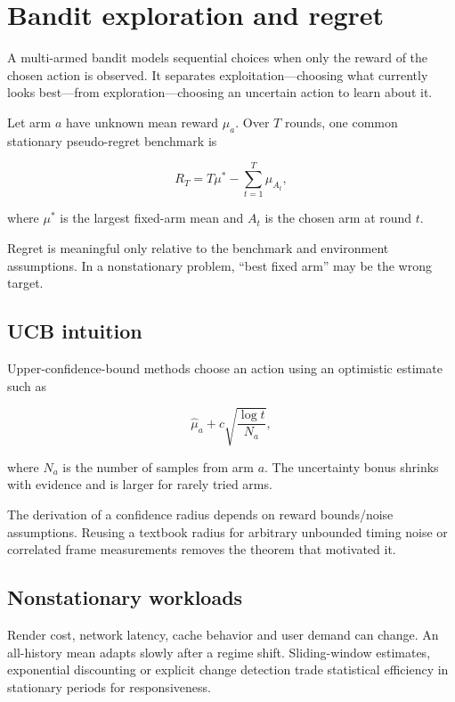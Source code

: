 \hypertarget{appendix-3dc863dbddf3}{}\label{referencestart:appendix-3dc863dbddf3}
\section{Bandit exploration and regret}\label{appendix-3dc863dbddf3-bandit-exploration-and-regret}

A multi-armed bandit models sequential choices when only the reward of the chosen action is observed. It separates exploitation---choosing what currently looks best---from exploration---choosing an uncertain action to learn about it.

Let arm \(a\) have unknown mean reward \(\mu_a\). Over \(T\) rounds, one common stationary pseudo-regret benchmark is

\[
R_T=T\mu^*-\sum_{t=1}^{T}\mu_{A_t},
\]

where \(\mu^*\) is the largest fixed-arm mean and \(A_t\) is the chosen arm at round \(t\).

Regret is meaningful only relative to the benchmark and environment assumptions. In a nonstationary problem, ``best fixed arm'' may be the wrong target.

\subsection{UCB intuition}\label{appendix-3dc863dbddf3-ucb-intuition}

Upper-confidence-bound methods choose an action using an optimistic estimate such as

\[
\hat\mu_a+
c\sqrt{\frac{\log t}{N_a}},
\]

where \(N_a\) is the number of samples from arm \(a\). The uncertainty bonus shrinks with evidence and is larger for rarely tried arms.

The derivation of a confidence radius depends on reward bounds/noise assumptions. Reusing a textbook radius for arbitrary unbounded timing noise or correlated frame measurements removes the theorem that motivated it.

\subsection{Nonstationary workloads}\label{appendix-3dc863dbddf3-nonstationary-workloads}

Render cost, network latency, cache behavior and user demand can change. An all-history mean adapts slowly after a regime shift. Sliding-window estimates, exponential discounting or explicit change detection trade statistical efficiency in stationary periods for responsiveness.

